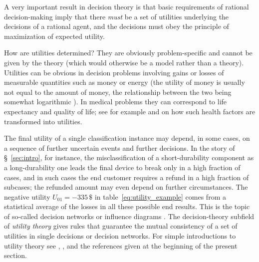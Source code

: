 \documentclass[\ifafour a4paper,12pt,\else a5paper,10pt,\fi%
onecolumn,oneside,article,%
british%
]{memoir}
\theoremstyle{remark}
\theoremstyle{innote}
\newcommand*{\p}{\mathrm{p}}%
\renewcommand*{\|}[1][]{\nonscript\:#1\vert\nonscript\:\mathopen{}}
\newcommand*{\sect}{\S}%
\newcommand*{\chap}{ch.}%
\newcommand*{\chaps}{chs}%
\newcommand*{\eg}{{e.g.}}
\renewcommand*{\texteuro}{\$}
\newcommand*{\eu}{\bar{U}}
\begin{document}

A very important result in decision theory is that basic requirements of rational decision-making imply that there \emph{must} be a set of utilities underlying the decisions of a rational agent, and the decisions must obey the principle of maximization of expected utility\autocites[\sect~15.2]{russelletal1995_r2022}[\chaps~2--3]{vonneumannetal1944_r1955}.

How are utilities determined? They are obviously problem-specific and cannot be given by the theory (which would otherwise be a model rather than a theory). Utilities can be obvious in decision problems involving gains or losses of measurable quantities such as money or energy (the utility of money is usually not equal to the amount of money, the relationship between the two being somewhat logarithmic \autocites[\eg][pp.~203--204]{north1968}[\chap~4]{raiffa1968_r1970}). In medical problems they can correspond to life expectancy and quality of life; see for example \cite[esp. \chap~8 and \sect~11.2.9]{soxetal1988_r2013} and \cite[esp. \chap~4]{huninketal2001_r2014} on how such health factors are transformed into utilities.

The final utility of a single classification instance may depend, in some cases, on a sequence of further uncertain events and further decisions. In the story of \sect~\ref{sec:intro}, for instance, the misclassification of a short-durability component as a long-durability one leads the final device to break only in a high fraction of cases, and in such cases the end customer requires a refund in a high fraction of subcases; the refunded amount may even depend on further circumstances. The negative utility $U_{01} = -335\,\text{\texteuro}$ in table~\eqref{eq:utility_example} comes from a statistical average of the losses in all these possible end results. This is the topic of so-called decision networks or influence diagrams \autocites[Besides the general references already given:][\sect~15.5]{russelletal1995_r2022}{howardetal1984b_r2005}[for a step-by-step tutorial:][]{raiffa1968_r1970}. The decision-theory subfield of \emph{utility theory} gives rules that guarantee the mutual consistency of a set of utilities in single decisions or decision networks. For simple introductions to utility theory see \cite[\sect~15.2]{russelletal1995_r2022}, \cite[pp.~201--205]{north1968}, and the references given at the beginning of the present section.
\end{document}
